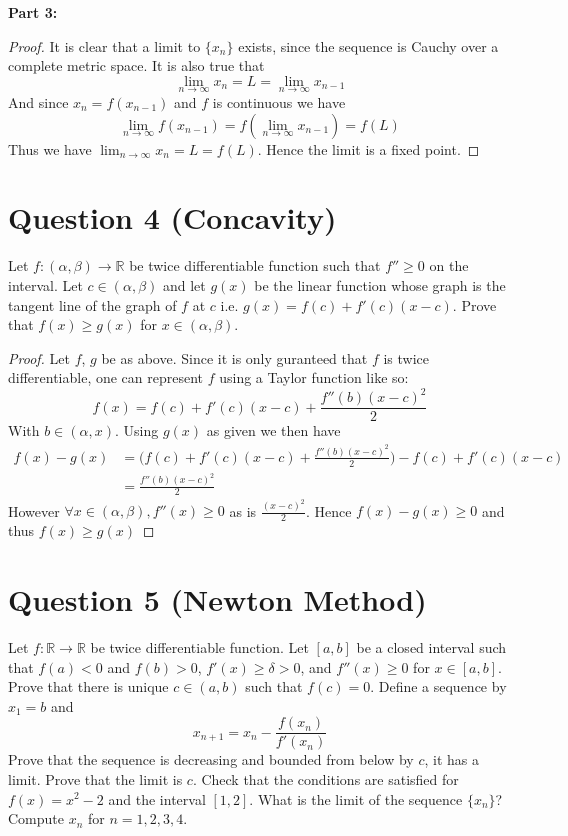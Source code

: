 \documentclass[12pt, letterpaper]{article}
\begin{document}
\textbf{Part 3:}
\begin{proof}
  It is clear that a limit to $\{x_n\}$ exists, since the sequence is Cauchy over a complete metric space. It is also true that
  $$ \lim_{n \to \infty} x_n = L = \lim_{n \to \infty} x_{n-1} $$
  And since $x_n = f(x_{n-1})$ and $f$ is continuous we have
  $$ \lim_{n \to \infty} f(x_{n-1}) = f(\lim_{n \to \infty} x_{n-1}) = f(L) $$
  Thus we have $\lim_{n \to \infty} x_{n} = L = f(L)$. Hence the limit is a fixed point.
\end{proof}
\section*{Question 4 (Concavity)}
Let $f: (\alpha,\beta)  \rightarrow \mathbb R$ be twice differentiable function such that $f''\geq 0$ on the interval. Let $c\in (\alpha,\beta)$ and let $g(x)$ be the linear
function whose graph is the tangent line of the graph of $f$ at $c$ i.e. $g(x)=f(c) + f'(c)(x-c)$. Prove that $f(x)\geq g(x)$ for $x\in (\alpha,\beta)$.

\begin{proof}
  Let $f$, $g$ be as above. Since it is only guranteed that $f$ is twice differentiable, one can represent $f$ using a Taylor function like so:
  $$ f(x) = f(c) + f'(c)(x - c) +\frac{f''(b)(x - c)^2}{2} $$
  With $b\in(\alpha, x)$. Using $g(x)$ as given we then have
  \begin{align*}
      f(x) - g(x) &= \Big(f(c) + f'(c)(x - c) +\frac{f''(b)(x - c)^2}{2}\Big) - f(c) + f'(c)(x-c)\\
      &= \frac{f''(b)(x - c)^2}{2}
  \end{align*}
  However $\forall x \in (\alpha, \beta), f''(x) \geq 0$ as is $\frac{(x - c)^2}{2}$. Hence $f(x) - g(x) \geq 0$ and thus $f(x) \geq g(x)$
\end{proof}
\pagebreak

\section*{Question 5 (Newton Method)}
Let $f: \mathbb R \rightarrow \mathbb R$ be twice differentiable function. Let $[a,b]$ be a closed interval such that $f(a) <0$ and $f(b)>0$, $f'(x) \geq \delta>0$,
and $f''(x)\geq 0$ for $x\in [a,b]$. Prove that there is unique $c\in (a,b)$ such that $f(c)=0$. Define a sequence by $x_1=b$ and
\[
x_{n+1} = x_n -\frac{f(x_n)}{f'(x_{n})}
\]
Prove that the sequence is decreasing and bounded from below by $c$, it has a limit.
Prove that the limit is $c$.  Check that the conditions are
satisfied for $f(x)=x^2-2$ and the interval
$[1,2]$. What is the limit of the sequence $\{x_n\}$? Compute $x_n$  for $n=1,2,3,4$.\\
\end{document}
